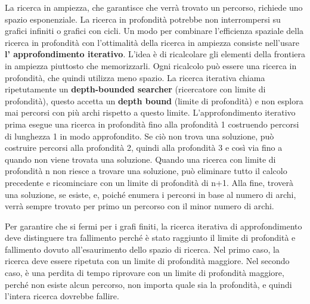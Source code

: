 \documentclass[a4paper]{extarticle}
\begin{document}
La ricerca in ampiezza, che garantisce che verrà trovato un percorso, richiede uno spazio esponenziale. La ricerca in profondità potrebbe non interrompersi su grafici infiniti o grafici con cicli. Un modo per combinare l'efficienza spaziale della ricerca in profondità con l'ottimalità della ricerca in ampiezza consiste nell'usare \textbf{l' approfondimento iterativo}. L'idea è di ricalcolare gli elementi della frontiera in ampiezza piuttosto che memorizzarli. Ogni ricalcolo può essere una ricerca in profondità, che quindi utilizza meno spazio. La ricerca iterativa chiama ripetutamente un \textbf{depth-bounded searcher} (ricercatore con limite di profondità), questo accetta un \textbf{depth bound} (limite di profondità) e non esplora mai percorsi con più archi rispetto a questo limite. L'approfondimento iterativo prima esegue una ricerca in profondità fino alla profondità 1 costruendo percorsi di lunghezza 1 in modo approfondito. Se ciò non trova una soluzione, può costruire percorsi alla profondità 2, quindi alla profondità 3 e così via fino a quando non viene trovata una soluzione. Quando una ricerca con limite di profondità n non riesce a trovare una soluzione, può eliminare tutto il calcolo precedente e ricominciare con un limite di profondità di n+1. Alla fine, troverà una soluzione, se esiste, e, poiché enumera i percorsi in base al numero di archi, verrà sempre trovato per primo un percorso con il minor numero di archi.

Per garantire che si fermi per i grafi finiti, la ricerca iterativa di approfondimento deve distinguere tra fallimento perché è stato raggiunto il limite di profondità e fallimento dovuto all'esaurimento dello spazio di ricerca. Nel primo caso, la ricerca deve essere ripetuta con un limite di profondità maggiore. Nel secondo caso, è una perdita di tempo riprovare con un limite di profondità maggiore, perché non esiste alcun percorso, non importa quale sia la profondità, e quindi l'intera ricerca dovrebbe fallire.
\end{document}
